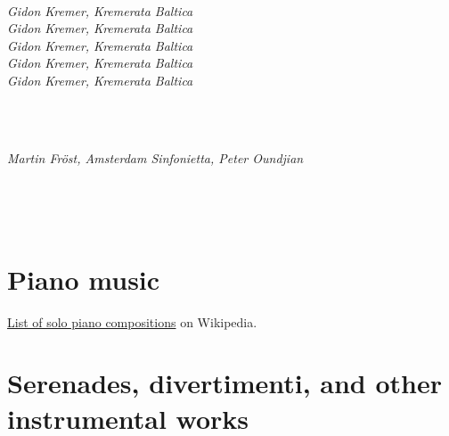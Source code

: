 \bigskip

 \\

 \textit{Gidon Kremer, Kremerata Baltica} \\
 \textit{Gidon Kremer, Kremerata Baltica} \\
 \textit{Gidon Kremer, Kremerata Baltica} \\
 \textit{Gidon Kremer, Kremerata Baltica} \\
 \textit{Gidon Kremer, Kremerata Baltica} \\

\bigskip

 \\

\bigskip

 \\

 \textit{Martin Fr\"{o}st, Amsterdam Sinfonietta, Peter Oundjian} \\  

\bigskip

 \\

\bigskip

 \\


\section{Piano music} %
\label{sec:piano_music}
\href{https://en.wikipedia.org/wiki/List_of_solo_piano_compositions_by_Wolfgang_Amadeus_Mozart}{List of solo piano compositions} on Wikipedia.




\section{Serenades, divertimenti, and other instrumental works} %
\label{sec:serenades_divertimenti_and_other_instrumental_works}

